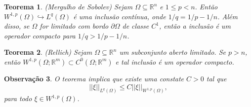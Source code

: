\documentclass[12pt]{book}
\newtheorem{teorema}{Teorema}[section]
\newtheorem{observacao}[teorema]{Observação}
\newcommand{\espacoLpGeral}[2]{L^{#1}(#2)}
\newcommand{\espacosobolev}[1]{W^{1,p}(#1)}
\newcommand{\espacosobolevcontradominio}[2]{W^{1,p}(#1;#2)}
\newcommand{\norma}[1]{||#1||}
\newcommand{\normaLgGeral}[3]{\norma{#1}_{\espacoLpGeral{#2}{#3}}}
\newcommand{\normaWpGeralDominio}[3]{\norma{#1}_{W^{1,#2}(#3)}}
\newcommand{\real}[1]{\mathbb{R}^{#1}}
\begin{document}
	\begin{teorema}\label{teorema_sobolev}
		(Mergulho de Sobolev) Sejam $\Omega \subseteq \real{n}$ e $1 \leq p < n$. Então $\espacosobolev{\Omega} \hookrightarrow L^{q}(\Omega)$ é uma inclusão contínua, onde $1/q = 1/p -1/n$. Além disso, se $\Omega$ for limitado com bordo $\partial\Omega$ de classe $C^{1}$, então a inclusão é um operador compacto para $1/q>1/p -1/n$.
	\end{teorema}
	
	\begin{teorema}\label{teorema_rellich}
		(Rellich) Sejam $\Omega \subseteq \real{n}$ um subconjunto aberto limitado. Se $p>n$, então $\espacosobolevcontradominio{\Omega}{\real{m}} \subset C^{0}(\Omega;\real{m})$ e tal inclusão é um operador compacto.
	\end{teorema}
	
	
	\begin{observacao}
		O teorema implica que existe uma constate $C>0$ tal que 
		$$
		\normaLgGeral{\xi}{q}{\Omega} \leq C \normaWpGeralDominio{\xi}{p}{\Omega},
		$$
		para todo $\xi\in \espacosobolev{\Omega}$.
	\end{observacao}
	
\end{document}
